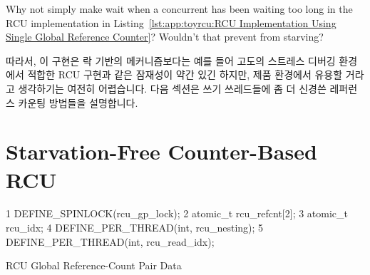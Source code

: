 	Why not simply make  wait when a concurrent
	 has been waiting too long in
	the RCU implementation in
	Listing~\ref{lst:app:toyrcu:RCU Implementation Using Single Global Reference Counter}?
	Wouldn't that prevent  from starving?
	\fi
{} \QuickQuizEnd

따라서, 이 구현은 락 기반의 메커니즘보다는 예를 들어 고도의 스트레스 디버깅
환경에서 적합한 RCU 구현과 같은 잠재성이 약간 있긴 하지만, 제품 환경에서 유용할
거라고 생각하기는 여전히 어렵습니다.
다음 섹션은 쓰기 쓰레드들에 좀 더 신경쓴 레퍼런스 카운팅 방법들을 설명합니다.
\iffalse

Therefore, it is still hard to imagine this implementation being useful
in a production setting, though it has a bit more potential
than the lock-based mechanism, for example, as an RCU implementation
suitable for a high-stress debugging environment.
The next section describes a variation on the reference-counting
scheme that is more favorable to writers.
\fi

\section{Starvation-Free Counter-Based RCU}
\label{sec:app:toyrcu:Starvation-Free Counter-Based RCU}

\begin{listing}[tbp]
{ \scriptsize
\begin{verbbox}
  1 DEFINE_SPINLOCK(rcu_gp_lock);
  2 atomic_t rcu_refcnt[2];
  3 atomic_t rcu_idx;
  4 DEFINE_PER_THREAD(int, rcu_nesting);
  5 DEFINE_PER_THREAD(int, rcu_read_idx);
\end{verbbox}
}
\centering
\theverbbox
\caption{RCU Global Reference-Count Pair Data}
\label{lst:app:toyrcu:RCU Global Reference-Count Pair Data}
\end{listing}

